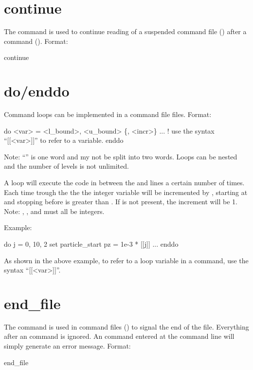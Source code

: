 \section{continue}
\label{s:continue}

The  command is used to continue reading of a suspended command file
() after a  command (). Format:
\begin{example}
  continue
\end{example}

\section{do/enddo}
\label{s:do}

Command loops can be implemented in a command file files. Format:
\begin{example}
  do <var> = <l_bound>, <u_bound> \{, <incr>\}
    ...   ! use the syntax ``[[<var>]]'' to refer to a variable.
  enddo
\end{example}
Note: ``'' is one word and my not be split into two words.
Loops can be nested and the number of levels is not unlimited. 

A loop will execute the code in between the  and  lines a certain number of
times. Each time trough the the the integer variable  will be incremented by ,
starting at  and stopping before  is greater than . If
 is not present, the increment will be 1. Note: , , and
 must all be integers.

Example:
\begin{example}
  do j = 0, 10, 2
    set particle_start pz = 1e-3 * [[j]]
    ...
  enddo
\end{example}
As shown in the above example, to refer to a loop variable in a command, use the syntax ``[[<var>]]''.

\section{end_file} \label{s:end.file}

The  command is used in command files () to signal the
end of the file. Everything after an  command is ignored. An 
command entered at the command line will simply generate an error message.  Format:
\begin{example}
  end_file
\end{example}

